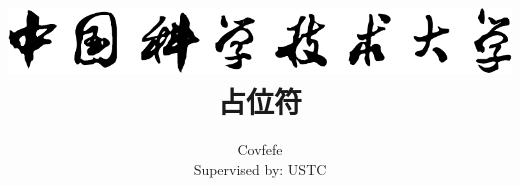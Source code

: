 \usepackage[utf8]{inputenc}
\usepackage{graphicx}
\usepackage[a4paper,width=150mm,top=25mm,bottom=25mm]{geometry}
\usepackage[UTF8]{ctex}
\usepackage{xcolor}  
\usepackage{tikz}
\usepackage{pst-blur}
\usepackage{pstricks-add}
\usepackage{unicode-math}
\usepackage[ruled,linesnumbered]{algorithm2e}
\usepackage{enumitem}
\usetikzlibrary{arrows,shapes,chains}
\usepackage{titlesec}
\titlespacing{\subsubsection}{0pt}{9pt}{-30pt}
\usepackage{hyperref}

\newcommand{\secondchapterurl}{}

\graphicspath{{figures/}}

\title{
    {\includegraphics[]{logo.pdf}}\\
    {占位符}
}


\author{Covfefe \\ Supervised by: USTC}



